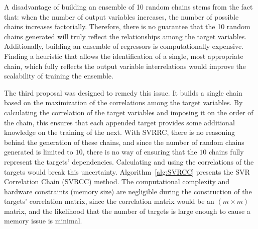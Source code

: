 \documentclass[reqno]{vcuthesis}
\numberwithin{equation}{chapter}
\begin{document}
A disadvantage of building an ensemble of 10 random chains stems from the fact that: when the number of output variables increases, the number of possible chains increases factorially. Therefore, there is no guarantee that the 10 random chains generated will truly reflect the relationships among the target variables. Additionally, building an ensemble of regressors is computationally expensive. Finding a heuristic that allows the identification of a single, most appropriate chain, which fully reflects the output variable interrelations would improve the scalability of training the ensemble. 

The third proposal was designed to remedy this issue. It builds a single chain based on the maximization of the correlations among the target variables. By calculating the correlation of the target variables and imposing it on the order of the chain, this ensures that each appended target provides some additional knowledge on the training of the next. With SVRRC, there is no reasoning behind the generation of these chains, and since the number of random chains generated is limited to $10$, there is no way of ensuring that the $10$ chains fully represent the targets' dependencies. Calculating and using the correlations of the targets would break this uncertainty. Algorithm~\ref{alg:SVRCC} presents the SVR Correlation Chain (SVRCC) method. The computational complexity and hardware constraints (memory size) are negligible during the construction of the targets' correlation matrix, since the correlation matrix would be an $(m \times m)$ matrix, and the likelihood that the number of targets is large enough to cause a memory issue is minimal. 
\end{document}
